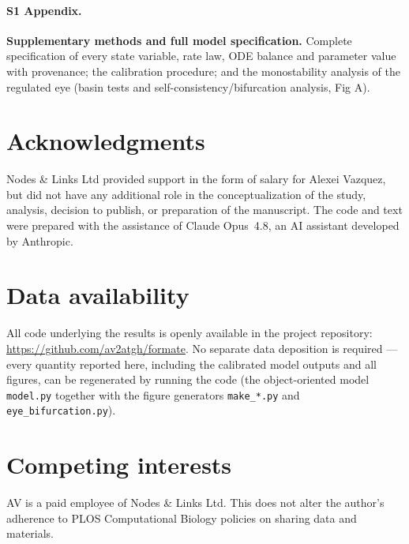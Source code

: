 \documentclass[10pt,letterpaper]{article}
\begin{document}
\paragraph*{S1 Appendix.}
\label{S1_Appendix}
\textbf{Supplementary methods and full model specification.} Complete
specification of every state variable, rate law, ODE balance and parameter value
with provenance; the calibration procedure; and the monostability analysis of the
regulated eye (basin tests and self-consistency/bifurcation analysis, Fig A).

\section*{Acknowledgments}
Nodes \& Links Ltd provided support in the form of salary for Alexei Vazquez, but
did not have any additional role in the conceptualization of the study, analysis,
decision to publish, or preparation of the manuscript. The code and text were
prepared with the assistance of Claude Opus~4.8, an AI assistant developed by
Anthropic.

\section*{Data availability}
All code underlying the results is openly available in the project repository:
\url{https://github.com/av2atgh/formate}. No separate data deposition is required
--- every quantity reported here, including the calibrated model outputs and all
figures, can be regenerated by running the code (the object-oriented model
\texttt{model.py} together with the figure generators \texttt{make\_*.py} and
\texttt{eye\_bifurcation.py}).

\section*{Competing interests}
AV is a paid employee of Nodes \& Links Ltd. This does not alter the author's
adherence to PLOS Computational Biology policies on sharing data and materials.

\nolinenumbers


\end{document}
